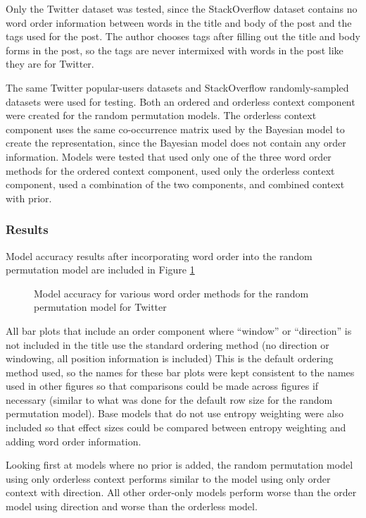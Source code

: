 \documentclass[man,floatsintext,donotrepeattitle]{apa6}
\begin{document}
Only the Twitter dataset was tested, since the StackOverflow dataset contains no word order information between words in the title and body of the post and the tags used for the post.
The author chooses tags after filling out the title and body forms in the post, so the tags are never intermixed with words in the post like they are for Twitter.

The same Twitter popular-users datasets and StackOverflow randomly-sampled datasets were used for testing.
Both an ordered and orderless context component were created for the random permutation models.
The orderless context component uses the same co-occurrence matrix used by the Bayesian model to create the representation, since the Bayesian model does not contain any order information.
Models were tested that used only one of the three word order methods for the ordered context component, used only the orderless context component, used a combination of the two components, and combined context with prior. 

\subsubsection{Results}

Model accuracy results after incorporating word order into the random permutation model are included in Figure \ref{figContextOrder}

\begin{figure}[!htbp]
  \caption{Model accuracy for various word order methods for the random permutation model for Twitter}
  \label{figContextOrder}
\end{figure}

All bar plots that include an order component where ``window'' or ``direction'' is not included in the title use the standard ordering method (no direction or windowing, all position information is included) 
This is the default ordering method used, so the names for these bar plots were kept consistent to the names used in other figures so that comparisons could be made across figures if necessary
(similar to what was done for the default row size for the random permutation model).
Base models that do not use entropy weighting were also included so that effect sizes could be compared between entropy weighting and adding word order information.

Looking first at models where no prior is added, the random permutation model using only orderless context performs similar to the model using only order context with direction.
All other order-only models perform worse than the order model using direction and worse than the orderless model.
\end{document}
